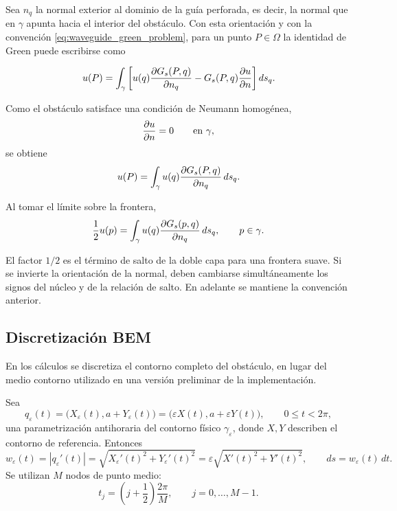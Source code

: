 \documentclass[11pt]{article}
\begin{document}
Sea \(n_q\) la normal exterior al dominio de la guía perforada, es decir, la normal que en
\(\gamma\) apunta hacia el interior del obstáculo. Con esta orientación y con la convención
\eqref{eq:waveguide_green_problem}, para un punto \(P\in\Omega\) la identidad de Green
puede escribirse como

\begin{equation}
u(P)
=
\int_{\gamma}
\left[
u(q)\pdv{G_s(P,q)}{n_q}
-
G_s(P,q)\pdv{u}{n}(q)
\right]ds_q.
\end{equation}

Como el obstáculo satisface una condición de Neumann homogénea,
\[
\pdv{u}{n}=0
\qquad\text{en }\gamma,
\]
se obtiene
\begin{equation}
u(P)
=
\int_{\gamma}
u(q)
\pdv{G_s(P,q)}{n_q}
\,ds_q.
\end{equation}

Al tomar el límite sobre la frontera,
\begin{equation}
\frac12u(p)
=
\int_{\gamma}
u(q)
\pdv{G_s(p,q)}{n_q}
\,ds_q,
\qquad p\in\gamma.
\label{eq:bie}
\end{equation}

El factor \(1/2\) es el término de salto de la doble capa para una frontera suave. Si se
invierte la orientación de la normal, deben cambiarse simultáneamente los signos del núcleo
y de la relación de salto. En adelante se mantiene la convención anterior.

\subsection{Discretización BEM}\label{sub:formulation}

En los cálculos se discretiza el contorno completo del obstáculo, en lugar del medio contorno utilizado en una versión preliminar de la implementación.

Sea
\[
q_\varepsilon(t)
=
\bigl(X_\varepsilon(t),a+Y_\varepsilon(t)\bigr)
=
\bigl(\varepsilon X(t),a+\varepsilon Y(t)\bigr),
\qquad
0\leq t<2\pi,
\]
una parametrización antihoraria del contorno físico \(\gamma_\varepsilon\), donde \(X,Y\) describen el contorno de referencia. Entonces
\begin{equation}
w_\varepsilon(t)=\left|q_\varepsilon'(t)\right|
=
\sqrt{X_\varepsilon'(t)^2+Y_\varepsilon'(t)^2}
=
\varepsilon\sqrt{X'(t)^2+Y'(t)^2},
\qquad
ds=w_\varepsilon(t)\,dt.
\label{eq:boundary_jacobian}
\end{equation}
Se utilizan \(M\) nodos de punto medio:
\begin{equation}
t_j=
\left(j+\frac12\right)\frac{2\pi}{M},
\qquad
j=0,\ldots,M-1.
\end{equation}
\end{document}
